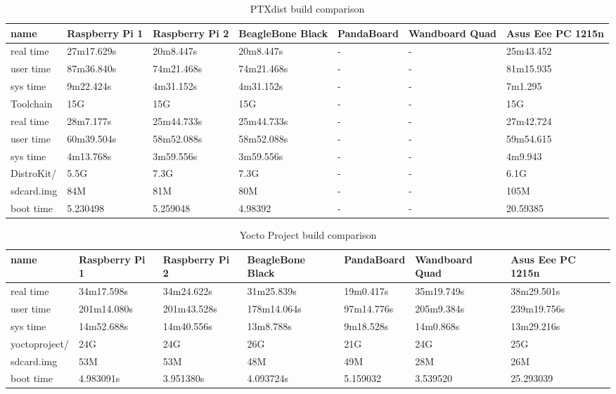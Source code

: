 \documentclass[printmode]{mgr}
\begin{document}
\begin{landscape}
\begin{table}
  \begin{tabular}{| p{2.5cm} | p{3cm} | p{3cm} | p{3cm} | p{3cm} | p{3cm} | p{3cm} |}
    \hline
    name & Raspberry Pi 1 & Raspberry Pi 2 & BeagleBone Black & PandaBoard & Wandboard Quad & Asus Eee PC 1215n \\
    \hline
    real time & 27m17.629s & 20m8.447s & 20m8.447s & - & - & 25m43.452 \\
    \hline
    user time & 87m36.840s & 74m21.468s & 74m21.468s & - & - & 81m15.935 \\
    \hline
    sys time & 9m22.424s & 4m31.152s & 4m31.152s & - & - & 7m1.295 \\
    \hline
    Toolchain & 15G & 15G & 15G & - & - & 15G \\
    \hline
    real time & 28m7.177s & 25m44.733s & 25m44.733s & - & - & 27m42.724 \\
    \hline
    user time & 60m39.504s & 58m52.088s & 58m52.088s & - & - & 59m54.615 \\
    \hline
    sys time & 4m13.768s & 3m59.556s & 3m59.556s & - & - & 4m9.943 \\
    \hline
    DistroKit/ & 5.5G & 7.3G & 7.3G & - & - & 6.1G \\
    \hline
    sdcard.img & 84M & 81M & 80M & - & - & 105M \\
    \hline
    boot time & 5.230498 & 5.259048 & 4.98392 & - & - & 20.59385 \\
    \hline
  \end{tabular}
  \caption{PTXdist build comparison}
\end{table}




\begin{table}
  \begin{tabular}{| p{2.5cm} | p{3cm} | p{3cm} | p{3cm} | p{3cm} | p{3cm} | p{3cm} |}
    \hline
    name & Raspberry Pi 1 & Raspberry Pi 2 & BeagleBone Black & PandaBoard & Wandboard Quad & Asus Eee PC 1215n \\
    \hline
    real time & 34m17.598s & 34m24.622s & 31m25.839s & 19m0.417s & 35m19.749s & 38m29.501s \\
    \hline
    user time & 201m14.080s & 201m43.528s & 178m14.064s & 97m14.776s & 205m9.384s & 239m19.756s \\
    \hline
    sys time & 14m52.688s & 14m40.556s & 13m8.788s & 9m18.528s & 14m0.868s & 13m29.216s \\
    \hline
    yoctoproject/ & 24G & 24G & 26G & 21G & 24G & 25G \\
    \hline
    sdcard.img & 53M & 53M & 48M & 49M & 28M & 26M \\
    \hline
    boot time & 4.983091s & 3.951380s & 4.093724s & 5.159032 & 3.539520 & 25.293039 \\
    \hline
  \end{tabular}
  \caption{Yocto Project build comparison}
\end{table}


\end{landscape}
\end{document}
